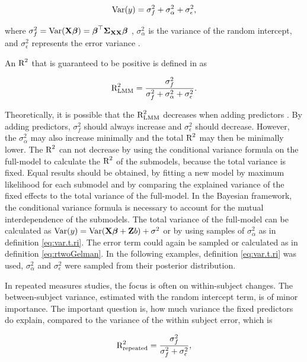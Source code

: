 \documentclass[11pt,a4paper,twoside]{book}\usepackage[]{graphicx}\usepackage[]{color}
\begin{document}
      \begin{align} 
        \operatorname{Var}(y) = \sigma_{f}^2  + \sigma_{\alpha}^2 + \sigma_{\epsilon}^2, \label{eq:var.t.ri} 
        \end{align}

where $\sigma_{f}^2 = \operatorname{Var}({\mathbf{X}} {\boldsymbol{\beta}}) = {\boldsymbol{\beta}}^\top {\boldsymbol{\Sigma}}{}_{{\mathbf{X}} {\mathbf{X}}}  {\boldsymbol{\beta}}$ , $\sigma_{\alpha}^2 $ is the variance of the random intercept, and $\sigma_{\epsilon}^2$ represents the error variance \citep{Nakagawa2013}. 

An $\text{R}^2$ that is guaranteed to be positive is defined in \cite{Nakagawa2013} as

   \begin{align} 
\text{R}^2_{\text{LMM}} = \frac{\sigma_{f}^2}{\sigma_{f}^2 + \sigma_{\alpha}^2 + \sigma_{\epsilon}^2}.
\end{align}


Theoretically, it is possible that the $\text{R}^2_{\text{LMM}}$ decreases when adding predictors \citep{Nakagawa2013}.  By adding predictors, $\sigma_{f}^2$  should always increase and  $\sigma_{\epsilon}^2$  should decrease. However, the $\sigma_{\alpha}^2$ may also increase minimally and the total $\text{R}^2$ may then be minimally lower. The $\text{R}^2$ can not decrease by using the conditional variance formula on the full-model to calculate the $\text{R}^2$ of the submodels, because the total variance is fixed. Equal results should be obtained, by fitting a new model by maximum likelihood for each submodel and by comparing the explained variance of the fixed effects to the total variance of the full-model.  In the Bayesian framework, the conditional variance formula is necessary to account for the mutual interdependence of the submodels. The total variance of the full-model can be calculated as  $\operatorname{Var}(y) = \operatorname{Var}({\mathbf{X}} {\boldsymbol{\beta}} + {\mathbf{Z}} b) + \sigma^2$ or by using samples of $\sigma_{\alpha}^2$ as in definition \eqref{eq:var.t.ri}. The error term could again be sampled or calculated as in definition \eqref{eq:rtwoGelman}. In the following examples, definition \eqref{eq:var.t.ri} was used,  $\sigma_{\alpha}^2$ and $\sigma_{\epsilon}^2$ were sampled from their posterior distribution.

In repeated measures studies, the focus is often on within-subject changes. The between-subject variance, estimated with the random intercept term, is of minor importance. The important question is, how much variance the fixed predictors do explain, compared to the variance of the within subject error, which is

   \begin{align} 
\text{R}^2_{\text{repeated}} = \frac{\sigma_{f}^2}{\sigma_{f}^2  + \sigma_{\epsilon}^2}, \label{eq:rtwo.repeated}
\end{align}
\end{document}
